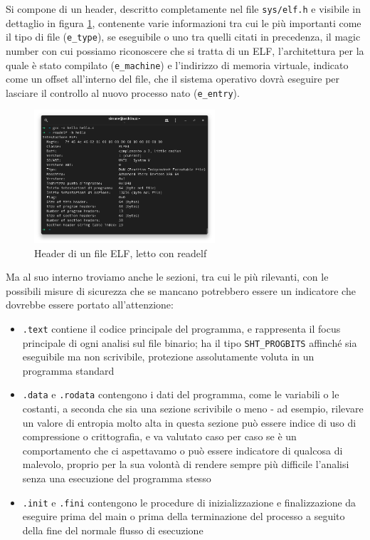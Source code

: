 Si compone di un header, descritto completamente nel file \texttt{sys/elf.h} e visibile in dettaglio in figura \ref{fig:elf_header}, contenente varie informazioni tra cui le più importanti come il tipo di file (\texttt{e\_type}), se eseguibile o uno tra quelli citati in precedenza,
il magic number con cui possiamo riconoscere che si tratta di un ELF,
l'architettura per la quale è stato compilato (\texttt{e\_machine})
e l'indirizzo di memoria virtuale, indicato come un offset all'interno del file, che il sistema operativo dovrà eseguire per lasciare il controllo al nuovo processo nato (\texttt{e\_entry}).

\begin{figure}[!ht]
    \centering
    \includegraphics[width=0.6\textwidth]{assets/elf_header.png}
    \caption{Header di un file ELF, letto con readelf}
    \label{fig:elf_header}
\end{figure}

Ma al suo interno troviamo anche le sezioni, tra cui le più rilevanti, con le possibili misure di sicurezza che se mancano potrebbero essere un indicatore che dovrebbe essere portato all'attenzione: \cite{forensic_friday_execs}
\begin{itemize}
    \item \texttt{.text} contiene il codice principale del programma, e rappresenta il focus principale di ogni analisi sul file binario; ha il tipo \texttt{SHT\_PROGBITS} affinché sia eseguibile ma non scrivibile, protezione assolutamente voluta in un programma standard
    \item \texttt{.data} e \texttt{.rodata} contengono i dati del programma, come le variabili o le costanti, a seconda che sia una sezione scrivibile o meno - ad esempio, rilevare un valore di entropia molto alta in questa sezione può essere indice di uso di compressione o crittografia, e va valutato caso per caso se è un comportamento che ci aspettavamo o può essere indicatore di qualcosa di malevolo, proprio per la sua volontà di rendere sempre più difficile l'analisi senza una esecuzione del programma stesso
    \item \texttt{.init} e \texttt{.fini} contengono le procedure di inizializzazione e finalizzazione da eseguire prima del main o prima della terminazione del processo a seguito della fine del normale flusso di esecuzione
\end{itemize}

